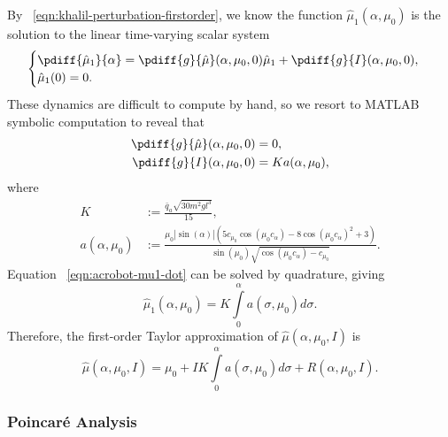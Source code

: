 By ~\eqref{eqn:khalil-perturbation-firstorder}, we know the function
\(\hat{\mu}_1(\alpha,\mu_0)\) is the solution to the linear time-varying scalar
system
\begin{equation}\label{eqn:acrobot-mu1-dot}
    \begin{cases}
        \pdiff{\hat{\mu}_1}{\alpha} = 
        \pdiff{g}{\hat{\mu}}(\alpha,\mu_0,0)\hat{\mu}_1 + \pdiff{g}{I}(\alpha, \mu_0, 0)
        , \\
        \hat{\mu}_1(0) = 0
        .
    \end{cases}
\end{equation}
These dynamics are difficult to compute by hand, so we resort to MATLAB symbolic
computation to reveal that
\begin{align*}
    \pdiff{g}{\hat{\mu}}(\alpha,\mu_0,0) &= 0
    , \\
    \pdiff{g}{I}(\alpha, \mu_0, 0) &= K a(\alpha,\mu_0)
    ,
\end{align*}
where 
\begin{align*}
    K &:= \frac{\bar{q}_a \sqrt{30m^2g l^3}}{15}
    , \\
    a(\alpha,\mu_0) &:= \frac{
        \mu_0 |\sin(\alpha)| \left(
        5 c_{\mu_0} \cos(\mu_0 c_\alpha) - 8 \cos(\mu_0c_\alpha)^2 + 3
    \right)
    }{
    \sin(\mu_0)\sqrt{\cos(\mu_0c_\alpha) - c_{\mu_0}}
    }
    .
\end{align*}
Equation ~\eqref{eqn:acrobot-mu1-dot} can be solved by quadrature, giving
\[
    \hat{\mu}_1(\alpha,\mu_0) =
    K \int \limits_0^\alpha a(\sigma,\mu_0)d\sigma
    .
\]
Therefore, the first-order Taylor approximation of \(\hat{\mu}(\alpha,\mu_0,I)\) is
\begin{equation}\label{eqn:acrobot-muhat-expanded}
    \hat{\mu}(\alpha,\mu_0,I)
    = \mu_0 + I K \int \limits_0^\alpha a(\sigma,\mu_0)d\sigma +
    R(\alpha,\mu_0,I)
    .
\end{equation}

\subsubsection{Poincar\'{e} Analysis}

